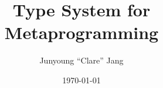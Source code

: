 \documentclass[25pt,a0paper,portrait,dvipsnames,innermargin=0.4in,colspace=0.4in,blockverticalspace=0.4in]{tikzposter}
\begin{document}
\title{Type System for Metaprogramming}
\author{Junyoung ``Clare'' Jang}
\date{\today}
\maketitle{}
\end{document}
